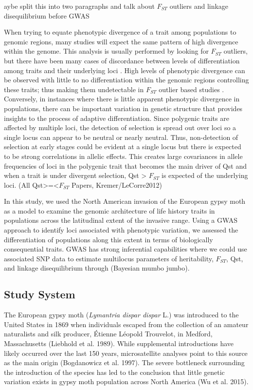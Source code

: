 \documentclass[smallextended]{svjour3}
\begin{document}
^^Maybe split this into two paragraphs and talk about $F_{ST}$ outliers and
linkage
disequilibrium before GWAS

When trying to equate phenotypic divergence of a trait among populations to
genomic regions, many studies will expect the same pattern of high divergence
within the genome. This analysis is usually performed by looking for $F_{ST}$
outliers, but there have been many cases of discordance between levels of
differentiation among traits and their underlying loci \citep{McKay:2002ek}. 
High
levels of phenotypic divergence can be observed with little to no
differentiation within the genomic regions controlling these traits; thus
making
them undetectable in $F_{ST}$ outlier based studies \citep{LeCorre:2003vi}.
Conversely, in instances where there is little apparent phenotypic divergence
in
populations, there can be important variation in genetic structure that
provides
insights to the process of adaptive differentiation. Since polygenic traits are
affected by multiple loci, the detection of selection is spread out over loci
so
a single locus can appear to be neutral or nearly neutral. Thus, non-detection
of selection at early stages could be evident at a single locus but there is
expected to be strong correlations in allelic effects. This creates large
covariances in allele frequencies of loci in the polygenic trait that becomes
the main driver of Qst and when a trait is under divergent selection, Qst >
$F_{ST}$
is expected of the underlying loci. (All Qst>=<$F_{ST}$ Papers,
Kremer/LeCorre2012)

In this study, we used the North American invasion of the European gypsy moth
as
a model to examine the genomic architecture of life history traits in
populations across the latitudinal extent of the invasive range.  Using a GWAS
approach to identify loci associated with phenotypic variation, we assessed the
differentiation of populations along this extent in terms of biologically
consequential traits. GWAS has strong inferential capabilities where we could
use associated SNP data to estimate multilocus parameters of heritability,
$F_{ST}$,
Qst, and linkage disequilibrium through (Bayesian mumbo jumbo).

\subsection*{Study System}

The European gypsy moth (\textit{Lymantria dispar dispar} L.) was introduced to
the United States in 1869 when individuals escaped from the collection of an
amateur naturalists and silk producer, Étienne Léopold Trouvelot, in Medford,
Massachusetts (Liebhold et al. 1989). While supplemental introductions have
likely occurred over the last 150 years, microsatellite analyses point to this
source as the main origin (Bogdanowicz et al. 1997). The severe bottleneck
surrounding the introduction of the species has led to the conclusion that
little genetic variation exists in gypsy moth population across North America
(Wu et al. 2015).
\end{document}
